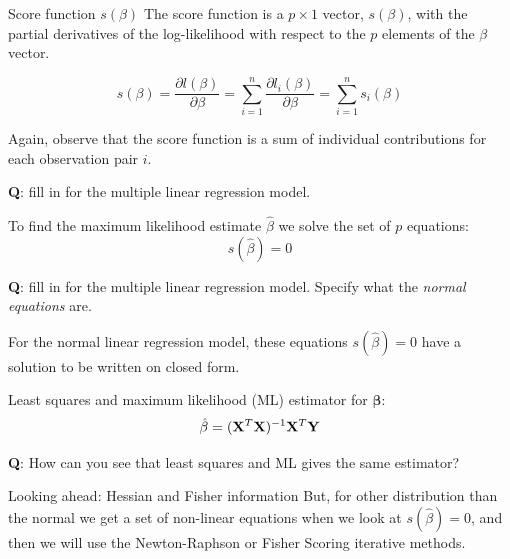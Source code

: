 \documentclass[
  ignorenonframetext,
]{beamer}
\begin{document}
\begin{frame}
\begin{block}{Score function \(s(\beta)\)}
\protect{}\label{score-function-sbeta}
The score function is a \(p\times 1\) vector, \(s(\beta)\), with the
partial derivatives of the log-likelihood with respect to the \(p\)
elements of the \(\beta\) vector.

\[
s(\beta)=\frac{\partial l(\beta)}{\partial \beta}=
\sum_{i=1}^n \frac{\partial l_i(\beta)}{\partial \beta}=
\sum_{i=1}^n s_i(\beta)
\]

Again, observe that the score function is a sum of individual
contributions for each observation pair \(i\).

\textbf{Q}: fill in for the multiple linear regression model.
\end{block}
\end{frame}

\begin{frame}
To find the maximum likelihood estimate \(\hat{\beta}\) we solve the set
of \(p\) equations: \[s(\hat{\beta})=0\]
\end{frame}

\begin{frame}
\textbf{Q}: fill in for the multiple linear regression model. Specify
what the \emph{normal equations} are.

For the normal linear regression model, these equations
\(s(\hat{\beta})=0\) have a solution to be written on closed form.
\end{frame}

\begin{frame}
\begin{block}{Least squares and maximum likelihood (ML) estimator for
\({\boldsymbol \beta}\):}
\protect{}\label{least-squares-and-maximum-likelihood-ml-estimator-for-boldsymbol-beta}
\[
\hat\beta=({\bf X}^T{\bf X})^{-1} {\bf X}^T {\bf Y}
\]

\textbf{Q}: How can you see that least squares and ML gives the same
estimator?
\end{block}
\end{frame}

\begin{frame}
\begin{block}{Looking ahead: Hessian and Fisher information}
\protect{}\label{looking-ahead-hessian-and-fisher-information}
But, for other distribution than the normal we get a set of non-linear
equations when we look at \(s(\hat{\beta})=0\), and then we will use the
Newton-Raphson or Fisher Scoring iterative methods.
\end{block}
\end{frame}
\end{document}
